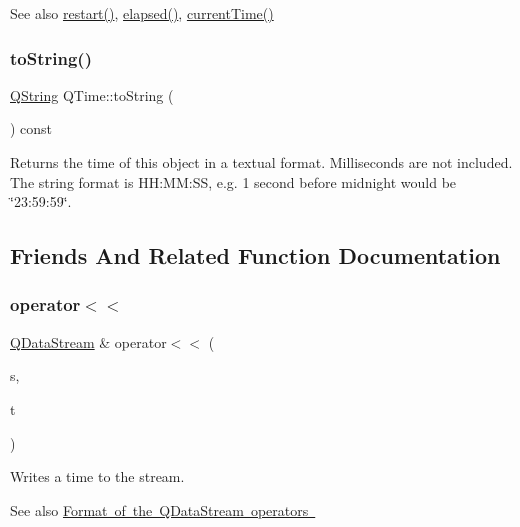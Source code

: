 \begin{DoxySeeAlso}{See also}
\mbox{\hyperlink{class_q_time_ae4031d9d548cfa663c03d64ac6eb32f6}{restart()}}, \mbox{\hyperlink{class_q_time_ae6223ec2c678edc4c0b4e8b4d51091c8}{elapsed()}}, \mbox{\hyperlink{class_q_time_a39b156ef7067e581f9fd70de6ef9ea4d}{current\+Time()}} 
\end{DoxySeeAlso}
\mbox{\label{class_q_time_a87ef6af883b329327e1665cc639d403c}} 
\subsubsection{\texorpdfstring{toString()}{toString()}}
{\footnotesize\ttfamily \mbox{\hyperlink{class_q_string}{Q\+String}} Q\+Time\+::to\+String (\begin{DoxyParamCaption}{ }\end{DoxyParamCaption}) const}

Returns the time of this object in a textual format. Milliseconds are not included. The string format is H\+H\+:\+MM\+:SS, e.\+g. 1 second before midnight would be \char`\"{}23\+:59\+:59\char`\"{}. 

\subsection{Friends And Related Function Documentation}
\mbox{\label{class_q_time_ac9b1103cf5f3deed4e057628fceca24d}} 
\subsubsection{\texorpdfstring{operator$<$$<$}{operator<<}}
{\footnotesize\ttfamily \mbox{\hyperlink{class_q_data_stream}{Q\+Data\+Stream}} \& operator$<$$<$ (\begin{DoxyParamCaption}\item[{\mbox{\hyperlink{class_q_data_stream}{Q\+Data\+Stream}} \&}]{s,  }\item[{const \mbox{\hyperlink{class_q_time}{Q\+Time}} \&}]{t }\end{DoxyParamCaption})\hspace{0.3cm}{\ttfamily [friend]}}

Writes a time to the stream.

\begin{DoxySeeAlso}{See also}
\mbox{\hyperlink{}{Format of the Q\+Data\+Stream operators }} 
\end{DoxySeeAlso}
\mbox{\label{class_q_time_a6b14dcf689d047394691ac627c5d2074}} 
